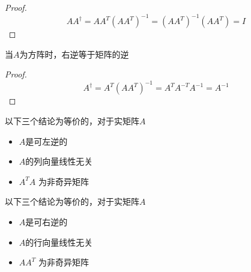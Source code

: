 \begin{proof}
    $$ A A^{\dagger}=A A^{T}\left(A A^{T}\right)^{-1}=\left(A A^{T}\right)^{-1}\left(A A^{T}\right)=I $$
\end{proof}

\begin{theorem}
    当$A$为方阵时，右逆等于矩阵的逆
\end{theorem}

\begin{proof}
    $$ A^{\dagger}=A^{T}\left(A A^{T}\right)^{-1}=A^{T} A^{-T} A^{-1}=A^{-1} $$
\end{proof}

\begin{corollary}
    以下三个结论为等价的，对于实矩阵$A$

    \begin{itemize}
        \item $A$是可左逆的
        \item $A$的列向量线性无关
        \item $ A^{T} A $ 为非奇异矩阵
    \end{itemize}
\end{corollary}

\begin{corollary}
    以下三个结论为等价的，对于实矩阵$A$

    \begin{itemize}
        \item $A$是可右逆的 
        \item $A$的行向量线性无关
        \item $ A A^{T} $ 为非奇异矩阵
    \end{itemize}
\end{corollary}

 


